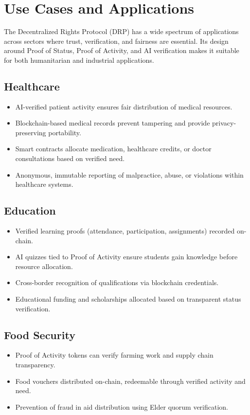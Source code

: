 \documentclass[11pt,a4paper]{article}
\begin{document}
\section{Use Cases and Applications}

The Decentralized Rights Protocol (DRP) has a wide spectrum of applications across sectors where trust, verification, and fairness are essential. Its design around Proof of Status, Proof of Activity, and AI verification makes it suitable for both humanitarian and industrial applications.

\subsection{Healthcare}
\begin{itemize}
    \item AI-verified patient activity ensures fair distribution of medical resources.
    \item Blockchain-based medical records prevent tampering and provide privacy-preserving portability.
    \item Smart contracts allocate medication, healthcare credits, or doctor consultations based on verified need.
    \item Anonymous, immutable reporting of malpractice, abuse, or violations within healthcare systems.
\end{itemize}

\subsection{Education}
\begin{itemize}
    \item Verified learning proofs (attendance, participation, assignments) recorded on-chain.
    \item AI quizzes tied to Proof of Activity ensure students gain knowledge before resource allocation.
    \item Cross-border recognition of qualifications via blockchain credentials.
    \item Educational funding and scholarships allocated based on transparent status verification.
\end{itemize}

\subsection{Food Security}
\begin{itemize}
    \item Proof of Activity tokens can verify farming work and supply chain transparency.
    \item Food vouchers distributed on-chain, redeemable through verified activity and need.
    \item Prevention of fraud in aid distribution using Elder quorum verification.
\end{itemize}
\end{document}
